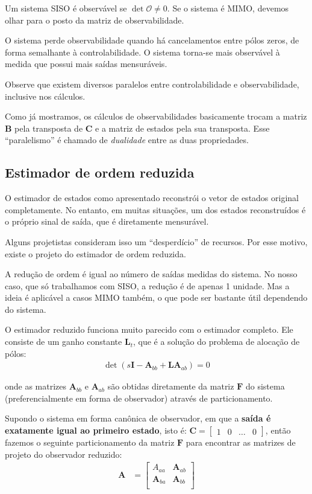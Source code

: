 \documentclass[
]{book}
\begin{document}
Um sistema SISO é observável se \(\det \mathbf{\mathcal{O}} \neq 0\). Se o
sistema é MIMO, devemos olhar para o posto da matriz de observabilidade.

O sistema perde observabilidade quando há cancelamentos entre pólos
zeros, de forma semalhante à controlabilidade. O sistema torna-se mais
observável à medida que possui mais saídas mensuráveis.

Observe que existem diversos paralelos entre controlabilidade e
observabilidade, inclusive nos cálculos.

Como já mostramos, os cálculos de observabilidades basicamente trocam a
matriz \(\mathbf{B}\) pela transposta de \(\mathbf{C}\) e a matriz de
estados pela sua transposta. Esse ``paralelismo'' é chamado de \emph{dualidade}
entre as duas propriedades.

\hypertarget{estimador-de-ordem-reduzida}{%
\subsection{Estimador de ordem reduzida}\label{estimador-de-ordem-reduzida}}

O estimador de estados como apresentado reconstrói o vetor de estados
original completamente. No entanto, em muitas situações, um dos estados
reconstruídos é o próprio sinal de saída, que é diretamente mensurável.

Alguns projetistas consideram isso um ``desperdício'' de recursos. Por
esse motivo, existe o projeto do estimador de ordem reduzida.

A redução de ordem é igual ao número de saídas medidas do sistema. No
nosso caso, que só trabalhamos com SISO, a redução é de apenas 1
unidade. Mas a ideia é aplicável a casos MIMO também, o que pode ser
bastante útil dependendo do sistema.

O estimador reduzido funciona muito parecido com o estimador completo.
Ele consiste de um ganho constante \(\mathbf{L}_t\), que é a solução do
problema de alocação de pólos: \[
\begin{align*}
    \det \left(s\mathbf{I-}\mathbf{A}_{bb}+\mathbf{L}\mathbf{A}_{ab}\right) = 0
\end{align*}
\]

onde as matrizes \(\mathbf{A}_{bb}\) e \(\mathbf{A}_{ab}\) são obtidas
diretamente da matriz \(\mathbf{F}\) do sistema (preferencialmente em
forma de observador) através de particionamento.

Supondo o sistema em forma canônica de observador, em que a \textbf{saída é
exatamente igual ao primeiro estado}, isto é:
\(\mathbf{C}=\left[\begin{array}{cccc}1 & 0 & \ldots & 0\end{array}\right]\),
então fazemos o seguinte particionamento da matriz \(\mathbf{F}\) para
encontrar as matrizes de projeto do observador reduzido: \[
\begin{align*}
\mathbf{A} &= \left[
\begin{array}{cc}
    {A}_{aa} & \mathbf{A}_{ab}\\
    \mathbf{A}_{ba} & \mathbf{A}_{bb}\\
\end{array}
\right]
\end{align*}
\]
\end{document}
